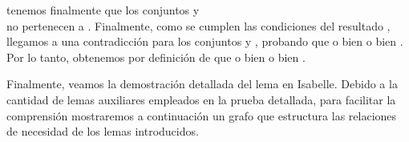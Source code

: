 \begin{isabellebody}
\begin{isamarkuptext}
\begin{demostracion}
  tenemos finalmente que los conjuntos  y\\  no pertenecen a .
  Finalmente, como se cumplen las condiciones del resultado , llegamos a una contradicción para 
  los conjuntos  y , probando que o bien  o bien . 
  Por lo tanto, obtenemos por definición de  que o bien  o bien .
 \end{demostracion}

  Finalmente, veamos la demostración detallada del lema en Isabelle. Debido a la cantidad de lemas
  auxiliares empleados en la prueba detallada, para facilitar la comprensión mostraremos a
  continuación un grafo que estructura las relaciones de necesidad de los lemas introducidos.
  

\end{isamarkuptext}
\end{isabellebody}
